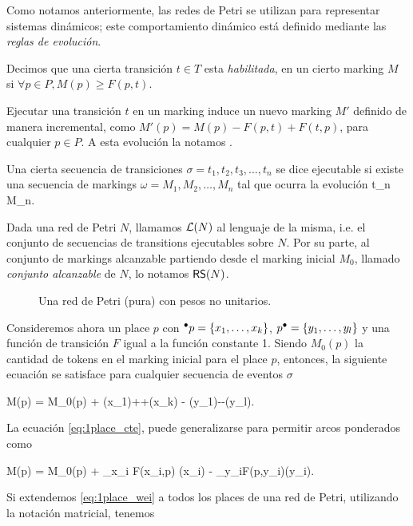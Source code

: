 Como notamos anteriormente, las redes de Petri se utilizan para representar sistemas 
dinámicos; este comportamiento dinámico está definido mediante las \emph{reglas de evolución}.

Decimos que una cierta transición $t \in T$ esta \emph{habilitada},
en un cierto marking $M$ si \mbox{$\forall p \in P, M(p) \ge F(p,t) $}.

Ejecutar una transición $t$ en un marking induce un nuevo marking $M'$
definido de manera incremental, como  \mbox{$M'(p) = M(p) - F(p,t) +  F(t,p)$},
para cualquier $p \in P$. A esta evolución la notamos .

Una cierta secuencia de transiciones \mbox{$\sigma = t_1,t_2, t_3, \ldots, t_n$}
se dice ejecutable si existe una secuencia de markings \mbox{$\omega = M_1, M_2, \ldots, M_n$}
tal que ocurra la evolución
 {t_n} {M_n}.

Dada una red de Petri $N$, llamamos $\mathcal{L}(N)$ al lenguaje de la misma, i.e.
el conjunto de secuencias de transitions ejecutables sobre $N$.
Por su parte, al conjunto de markings alcanzable partiendo desde el marking inicial $M_0$,
llamado \emph{conjunto alcanzable} de $N$, lo notamos $\textsf{RS}(N)$.

\begin{figure}[t]
  	\centering
    
    \caption{Una red de Petri (pura) con pesos no unitarios.}
    \label{fig:pn1}
\end{figure}

Consideremos ahora un place $p$ con
\mbox{$\mbox{$^\bullet p$}=\{x_1,\ldots,x_k\}$},
\mbox{$\mbox{$p^\bullet$}=\{y_1,\ldots,y_l\}$} y una función de transición 
$F$ igual a la función constante 1.
Siendo $M_0(p)$ la cantidad de tokens en el marking inicial 
para el place $p$, entonces, la siguiente ecuación
se satisface para cualquier secuencia de eventos $\sigma$

M(p) = M_0(p) + \widehat\sigma(x_1)+\cdots +\widehat\sigma(x_k) -
\widehat\sigma(y_1)-\cdots -\widehat\sigma(y_l).
\eeq

La ecuación \eqref{eq:1place_cte}, puede generalizarse para permitir arcos
ponderados como

M(p) = M_0(p) + \sum_{x_i \in {}}F(x_i,p)\cdot
\widehat\sigma(x_i) -
\sum_{y_i\in{}}F(p,y_i)\cdot\widehat\sigma(y_i).
\eeq

Si extendemos \eqref{eq:1place_wei} a todos los places de una red de Petri,
utilizando la notación matricial, tenemos

